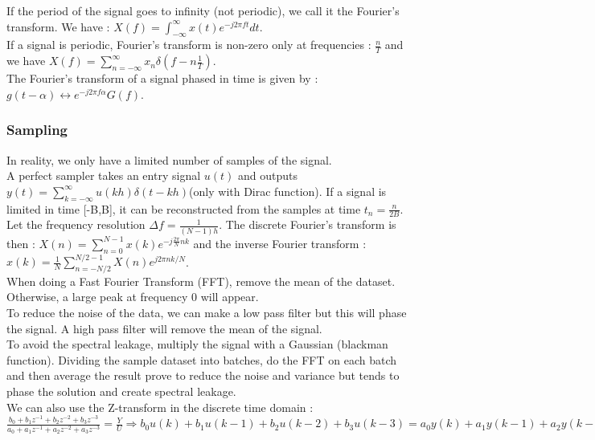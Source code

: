 \documentclass[../main.tex]{subfiles}
\begin{document}
If the period of the signal goes to infinity (not periodic), we call it the Fourier's transform. We have : $X(f) = \int_{-\infty}^\infty x(t) e^{-j2\pi f t}dt$.\\

If a signal is periodic, Fourier's transform is non-zero only at frequencies : $\frac{n}{T}$ and we have $X(f) = \sum_{n=-\infty}^\infty x_n \delta (f-n\frac{1}{T})$.\\
 The Fourier's transform of a signal phased in time is given by : $g(t-\alpha) \leftrightarrow e^{-j2\pi f\alpha} G(f)$.\\

 \subsubsection{Sampling}
In reality, we only have a limited number of samples of the signal. \\
A perfect sampler takes an entry signal $u(t)$ and outputs $y(t) = \sum_{k=-\infty}^\infty u(kh) \delta (t-kh)$(only with Dirac function). If a signal is limited in time [-B,B], it can be reconstructed from the samples at time $t_n = \frac{n}{2B}$.\\

Let the frequency resolution $\Delta f = \frac{1}{(N-1) h}$. The discrete Fourier's transform is then : $X(n) = \sum_{n=0}^{N-1} x(k) e^{-j \frac{2\pi}{N}nk}$ and the inverse Fourier transform : $x(k)= \frac{1}{N} \sum_{n=-N/2}^{N/2-1} X(n) e^{j2\pi nk/N}$.\\

When doing a Fast Fourier Transform (FFT), remove the mean of the dataset. Otherwise, a large peak at frequency 0 will appear.\\
To reduce the noise of the data, we can make a low pass filter but this will phase the signal. A high pass filter will remove the mean of the signal. \\
To avoid the spectral leakage, multiply the signal with a Gaussian (blackman function). Dividing the sample dataset into batches, do the FFT on each batch and then average the result prove to reduce the noise and variance but tends to phase the solution and create spectral leakage.\\

We can also use the Z-transform in the discrete time domain : $\frac{b_0 + b_1 z^{-1} + b_2 z^{-2} + b_3 z^{-3} }{a_0 + a_1 z^{-1} + a_2 z^{-2} + a_3 z^{-3} } = \frac{Y}{U} \Rightarrow b_0 u(k) + b_1 u(k-1) + b_2 u(k-2)  + b_3 u(k-3) = a_0 y(k) + a_1 y(k-1) + a_2 y(k-2) + a_3 y(k-3)$\\
\end{document}
